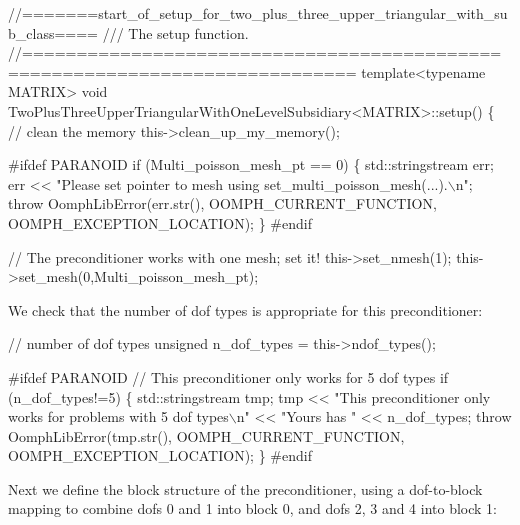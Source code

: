 \begin{DoxyCodeInclude}
 \textcolor{comment}{//=======start\_of\_setup\_for\_two\_plus\_three\_upper\_triangular\_with\_sub\_class====}\textcolor{comment}{}
\textcolor{comment}{ /// The setup function.}
\textcolor{comment}{} \textcolor{comment}{//============================================================================}
 \textcolor{keyword}{template}<\textcolor{keyword}{typename} MATRIX> 
 \textcolor{keywordtype}{void} TwoPlusThreeUpperTriangularWithOneLevelSubsidiary<MATRIX>::setup()
 \{
  \textcolor{comment}{// clean the memory}
  this->clean\_up\_my\_memory();

\textcolor{preprocessor}{#ifdef PARANOID}
  \textcolor{keywordflow}{if} (Multi\_poisson\_mesh\_pt == 0)
   \{
    std::stringstream err;
    err << \textcolor{stringliteral}{"Please set pointer to mesh using set\_multi\_poisson\_mesh(...).\(\backslash\)n"};
    \textcolor{keywordflow}{throw} OomphLibError(err.str(),
                        OOMPH\_CURRENT\_FUNCTION,
                        OOMPH\_EXCEPTION\_LOCATION);
   \}
\textcolor{preprocessor}{#endif }
  
  \textcolor{comment}{// The preconditioner works with one mesh; set it!}
  this->set\_nmesh(1);
  this->set\_mesh(0,Multi\_poisson\_mesh\_pt);

\end{DoxyCodeInclude}


We check that the number of dof types is appropriate for this preconditioner\+: 
\begin{DoxyCodeInclude}

  \textcolor{comment}{// number of dof types  }
  \textcolor{keywordtype}{unsigned} n\_dof\_types = this->ndof\_types();

\textcolor{preprocessor}{#ifdef PARANOID}
  \textcolor{comment}{// This preconditioner only works for 5 dof types}
  \textcolor{keywordflow}{if} (n\_dof\_types!=5)
   \{
    std::stringstream tmp;
    tmp << \textcolor{stringliteral}{"This preconditioner only works for problems with 5 dof types\(\backslash\)n"}
        << \textcolor{stringliteral}{"Yours has "} << n\_dof\_types;
    \textcolor{keywordflow}{throw} OomphLibError(tmp.str(),
                        OOMPH\_CURRENT\_FUNCTION,
                        OOMPH\_EXCEPTION\_LOCATION);
   \}
\textcolor{preprocessor}{#endif}

\end{DoxyCodeInclude}


Next we define the block structure of the preconditioner, using a dof-\/to-\/block mapping to combine dofs 0 and 1 into block 0, and dofs 2, 3 and 4 into block 1\+:


